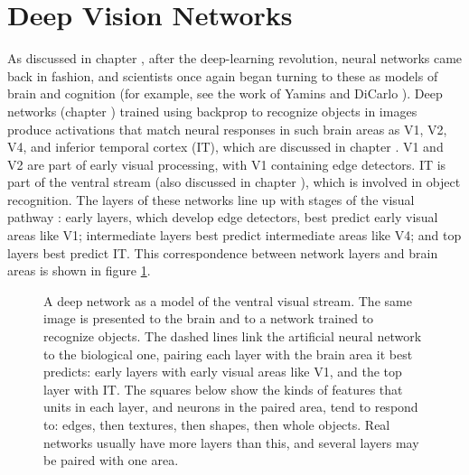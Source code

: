 \section{Deep Vision Networks}\label{deepVisionNets}

As discussed in chapter , after the deep-learning revolution, neural networks came back in fashion, and scientists once again began turning to these as models of brain and cognition (for example, see the work of Yamins and DiCarlo \cite{yamins2014performance, yamins2016using}). Deep networks (chapter ) trained using backprop to recognize objects in images produce activations that match neural responses in such brain areas as V1, V2, V4, and inferior temporal cortex (IT), which are discussed in chapter .  V1 and V2 are part of early visual processing, with V1 containing edge detectors. IT is part of the ventral stream (also discussed in chapter ), which is involved in object recognition. The layers of these networks line up with stages of the visual pathway \cite{gucclu2015deep}: early layers, which develop edge detectors, best predict early visual areas like V1; intermediate layers best predict intermediate areas like V4; and top layers best predict IT. This correspondence between network layers and brain areas is shown in figure \ref{ventralStreamNetwork}.

\begin{figure}[htbp]
\centering
{}
\caption[Jeff Yoshimi, based on \cite{yamins2016using}.]{A deep network as a model of the ventral visual stream. The same image is presented to the brain and to a network trained to recognize objects. The dashed lines link the artificial neural network to the biological one, pairing each layer with the brain area it best predicts: early layers with early visual areas like V1, and the top layer with IT. The squares below show the kinds of features that units in each layer, and neurons in the paired area, tend to respond to: edges, then textures, then shapes, then whole objects. Real networks usually have more layers than this, and several layers may be paired with one area.}
\label{ventralStreamNetwork}
\end{figure}

